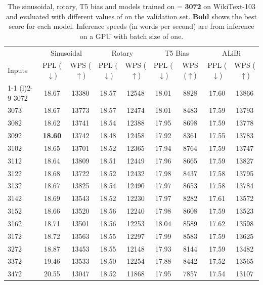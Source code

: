\begin{table}[]
\small
\caption{The sinusoidal, rotary, T5 bias and \al models  trained on \lt = \textbf{3072} on WikiText-103 and evaluated with different values of \li on the validation set. \textbf{Bold} shows the best score for each model. Inference speeds (in words per second) are from inference on a GPU with batch size of one.}
\label{tab:appendix:wt103_extra_3072}
\begin{center}

\begin{tabular}{@{}lcccccccc@{}} \toprule
 &  \multicolumn{2}{c}{Sinusoidal} & \multicolumn{2}{c}{Rotary} &\multicolumn{2}{c}{T5 Bias} & \multicolumn{2}{c}{ALiBi} \\
Inputs & PPL ($\downarrow$) & WPS ($\uparrow$)& PPL ($\downarrow$) & WPS ($\uparrow$)& PPL ($\downarrow$) & WPS ($\uparrow$)& PPL ($\downarrow$) & WPS ($\uparrow$) \\ \cmidrule(r){1-1} \cmidrule(l){2-9}
3072  & 18.67  & 13380 & 18.57 & 12548 & 18.01 & 8828 & 17.60 & 13866 \\ 
3073  & 18.67  & 13773 & 18.57 & 12474 & 18.01 & 8483 & 17.59 & 13793 \\
3082  & 18.62  & 13741 & 18.54 & 12388 & 17.95 & 8698 & 17.59 & 13778 \\
3092  &\textbf{ 18.60 } & 13742 & 18.48 & 12458 & 17.92 & 8361 & 17.55 & 13783 \\
3102  & 18.65  & 13701 & 18.52 & 12365 & 17.94 & 8764 & 17.59 & 13747 \\
3112  & 18.64  & 13809 & 18.51 & 12449 & 17.96 & 8665 & 17.59 & 13827 \\
3122  & 18.68  & 13722 & 18.52 & 12432 & 17.98 & 8437 & 17.58 & 13795 \\
3132  & 18.67  & 13825 & 18.54 & 12490 & 17.97 & 8653 & 17.58 & 13784 \\
3142  & 18.69  & 13543 & 18.52 & 12230 & 17.97 & 8282 & 17.61 & 13572 \\
3152  & 18.66  & 13520 & 18.56 & 12240 & 17.98 & 8608 & 17.59 & 13523 \\
3162  & 18.71  & 13501 & 18.56 & 12253 & 18.04 & 8589 & 17.62 & 13598 \\
3172  & 18.72  & 13563 & 18.55 & 12297 & 17.99 & 8583 & 17.59 & 13625 \\
3272  & 18.87  & 13453 & 18.55 & 12148 & 17.93 & 8144 & 17.59 & 13482 \\
3372  & 19.46  & 13533 & 18.50 & 12254 & 17.88 & 8442 & 17.52 & 13565 \\
3472  & 20.55  & 13047 & 18.52 & 11868 & 17.95 & 7857 & 17.54 & 13107 \\

\end{tabular}
\end{center}
\end{table}
